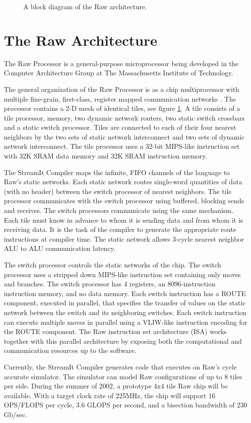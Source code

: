 \begin{figure}[t]
\centering
{}
\caption{A block diagram of the Raw architecture.
\protect\label{fig:raw-diagram}}
\end{figure}

\section{The Raw Architecture}
\label{sec:raw}
The Raw Processor is a general-purpose microprocessor being developed
in the Computer Architecture Group at The Massachusetts Institute of
Technology.

The general organization of the Raw Processor is as a chip
multiprocessor with multiple fine-grain, first-class, register mapped
communication networks \cite{raw}.  The processor contains a 2-D mesh
of identical tiles, see figure \ref{fig:raw-diagram}.  A tile consists
of a tile processor, memory, two dynamic network routers, two static
switch crossbars and a static switch processor.  Tiles are connected
to each of their four nearest neighbors by the two sets of static
network interconnect and two sets of dynamic network interconnect.
The tile processor uses a 32-bit MIPS-like instruction set with 32K
SRAM data memory and 32K SRAM instruction memory.

The StreamIt Compiler maps the infinite, FIFO channels of the language
to Raw's static networks.  Each static network routes single-word
quantities of data (with no header) between the switch processor of
nearest neighbors.  The tile processor communicates with the switch
processor using buffered, blocking sends and receives.  The switch
processors communicate using the same mechanism. Each tile must know
in advance to whom it is sending data and from whom it is receiving
data.  It is the task of the compiler to generate the appropriate
route instructions at compiler time.  The static network allows
3-cycle nearest neighbor ALU to ALU communication latency.

The switch processor controls the static networks of the chip.  The
switch processor uses a stripped down MIPS-like instruction set
containing only moves and branches.  The switch processor has 4
registers, an 8096-instruction instruction memory, and no data
memory. Each switch instruction has a ROUTE component, executed in
parallel, that specifies the transfer of values on the static network
between the switch and its neighboring switches.  Each switch
instruction can execute multiple moves in parallel using a VLIW-like
instruction encoding for the ROUTE component.  The Raw instruction set
architecture (ISA) works together with this parallel architecture by
exposing both the computational and communication resources up to the
software.

Currently, the StreamIt Compiler generates code that executes on Raw's
cycle accurate simulator. The simulator can model Raw configurations
of up to 8 tiles per side.  During the summer of 2002, a prototype 4x4
tile Raw chip will be available.  With a target clock rate of 225MHz,
the chip will support 16 OPS/FLOPS per cycle, 3.6 GLOPS per second,
and a bisection bandwidth of 230 Gb/sec.
